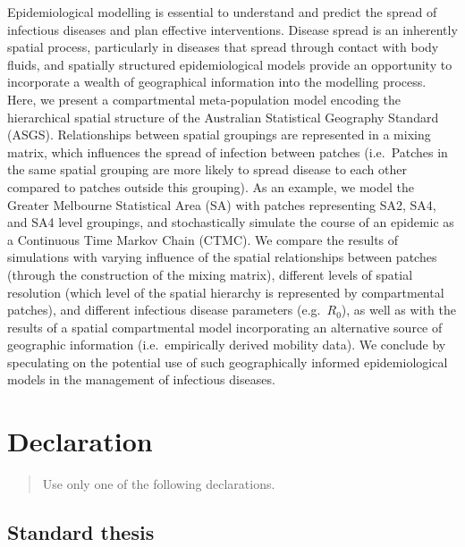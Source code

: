 \documentclass[
  letterpaper,
  DIV=11,
  numbers=noendperiod]{scrreprt}
\begin{document}
Epidemiological modelling is essential to understand and predict the
spread of infectious diseases and plan effective interventions. Disease
spread is an inherently spatial process, particularly in diseases that
spread through contact with body fluids, and spatially structured
epidemiological models provide an opportunity to incorporate a wealth of
geographical information into the modelling process. Here, we present a
compartmental meta-population model encoding the hierarchical spatial
structure of the Australian Statistical Geography Standard (ASGS).
Relationships between spatial groupings are represented in a mixing
matrix, which influences the spread of infection between patches
(i.e.~Patches in the same spatial grouping are more likely to spread
disease to each other compared to patches outside this grouping). As an
example, we model the Greater Melbourne Statistical Area (SA) with
patches representing SA2, SA4, and SA4 level groupings, and
stochastically simulate the course of an epidemic as a Continuous Time
Markov Chain (CTMC). We compare the results of simulations with varying
influence of the spatial relationships between patches (through the
construction of the mixing matrix), different levels of spatial
resolution (which level of the spatial hierarchy is represented by
compartmental patches), and different infectious disease parameters
(e.g.~\(R_0\)), as well as with the results of a spatial compartmental
model incorporating an alternative source of geographic information
(i.e.~empirically derived mobility data). We conclude by speculating on
the potential use of such geographically informed epidemiological models
in the management of infectious diseases.


\hypertarget{declaration}{%
\chapter*{Declaration}\label{declaration}}


\begin{quote}
Use only one of the following declarations.
\end{quote}

\hypertarget{standard-thesis}{%
\section*{Standard thesis}\label{standard-thesis}}
\end{document}
